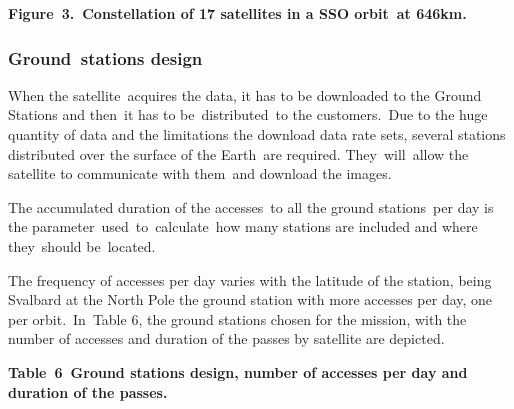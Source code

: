 \documentclass[a4paper]{article}
\begin{document}
{\centering\bfseries
\label{bkm:Ref376947064}Figure\ 3.\ Constellation of 17 satellites in a
SSO orbit\ at 646km.
\par}

\subsubsection[Ground\ stations design]{Ground\ stations design}
\hypertarget{Toc381777189}{}When the satellite\ acquires the data, it
has to be downloaded to the Ground Stations and then\ it has to
be\ distributed\ to the customers.\ Due to the huge quantity of data
and the limitations the download data rate sets, several stations
distributed over the surface of the Earth\ are required.
They\ will\ allow the satellite to communicate with them\ and download
the images.\ 


\bigskip

The accumulated duration of the accesses\ to all the ground
stations\ per day is the parameter\ used\ to\ calculate\ how many
stations are included and where they\ should be\ located.\ 


\bigskip

The frequency of accesses per day varies with the latitude of the
station, being Svalbard at the North Pole the ground station with more
accesses per day, one per orbit.\ In\ Table 6, the ground stations
chosen for the mission, with the number of accesses and duration of the
passes by satellite are depicted.

{\centering\bfseries
\label{bkm:Ref377044034}Table\ 6\ Ground stations design, number of
accesses per day and duration of the passes.
\par}
\end{document}
